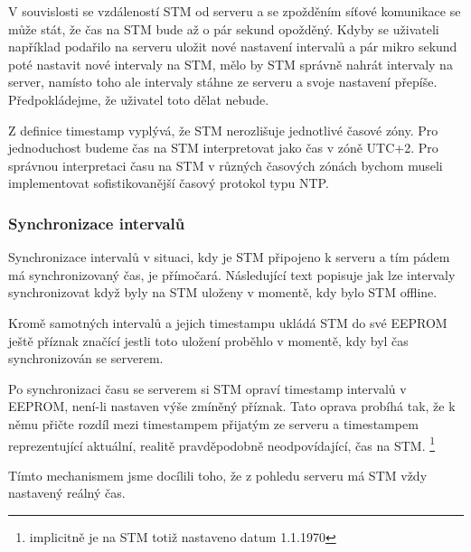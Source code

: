 V souvislosti se vzdáleností STM od serveru a se zpožděním síťové komunikace se může
stát, že čas na STM bude až o pár sekund opožděný.
Kdyby se uživateli například podařilo na serveru uložit nové nastavení intervalů
a pár mikro sekund poté nastavit nové intervaly na STM, mělo by STM správně nahrát
intervaly na server, namísto toho ale intervaly stáhne ze serveru a svoje nastavení přepíše.
Předpokládejme, že uživatel toto dělat nebude.

Z definice timestamp vyplývá, že STM nerozlišuje jednotlivé časové zóny.
Pro jednoduchost budeme čas na STM interpretovat jako čas v zóně UTC+2.
Pro správnou interpretaci času na STM v různých časových zónách bychom museli implementovat
sofistikovanější časový protokol typu NTP.

\subsubsection{Synchronizace intervalů}
Synchronizace intervalů v situaci, kdy je STM připojeno k serveru a tím pádem má synchronizovaný
čas, je přímočará.
Následující text popisuje jak lze intervaly synchronizovat když byly na STM uloženy v momentě, kdy
bylo STM offline.

Kromě samotných intervalů a jejich timestampu ukládá STM do své EEPROM ještě příznak značící
jestli toto uložení proběhlo v momentě, kdy byl čas synchronizován se serverem.

Po synchronizaci času se serverem si STM opraví timestamp intervalů v EEPROM, není-li nastaven
výše zmíněný příznak.
Tato oprava probíhá tak, že k němu přičte rozdíl mezi timestampem přijatým ze serveru a timestampem
reprezentující aktuální, realitě pravděpodobně neodpovídající, čas na STM.
\footnote{implicitně je na STM totiž nastaveno datum 1.1.1970}

Tímto mechanismem jsme docílili toho, že z pohledu serveru má STM vždy nastavený reálný čas.


